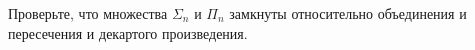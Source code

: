 Проверьте, что множества $\Sigma_n$ и $\Pi_n$ замкнуты относительно объединения и пересечения и декартого
произведения.
